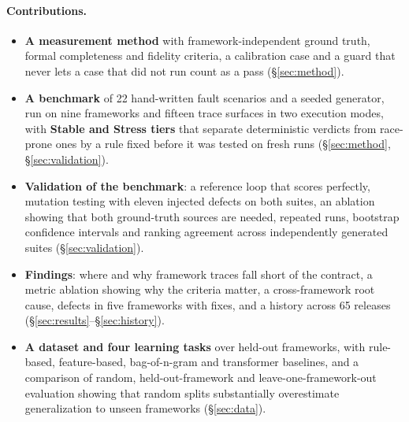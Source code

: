 \documentclass[10pt]{article}
\begin{document}
\paragraph{Contributions.}
\begin{itemize}
\item \textbf{A measurement method} with framework-independent ground truth, formal completeness and fidelity criteria, a calibration case and a guard that never lets a case that did not run count as a pass (\S\ref{sec:method}).
\item \textbf{A benchmark} of 22 hand-written fault scenarios and a seeded generator, run on nine frameworks and fifteen trace surfaces in two execution modes, with \textbf{Stable and Stress tiers} that separate deterministic verdicts from race-prone ones by a rule fixed before it was tested on fresh runs (\S\ref{sec:method}, \S\ref{sec:validation}).
\item \textbf{Validation of the benchmark}: a reference loop that scores perfectly, mutation testing with eleven injected defects on both suites, an ablation showing that both ground-truth sources are needed, repeated runs, bootstrap confidence intervals and ranking agreement across independently generated suites (\S\ref{sec:validation}).
\item \textbf{Findings}: where and why framework traces fall short of the contract, a metric ablation showing why the criteria matter, a cross-framework root cause, defects in five frameworks with fixes, and a history across 65 releases (\S\ref{sec:results}--\S\ref{sec:history}).
\item \textbf{A dataset and four learning tasks} over held-out frameworks, with rule-based, feature-based, bag-of-n-gram and transformer baselines, and a comparison of random, held-out-framework and leave-one-framework-out evaluation showing that random splits substantially overestimate generalization to unseen frameworks (\S\ref{sec:data}).
\end{itemize}
\end{document}
